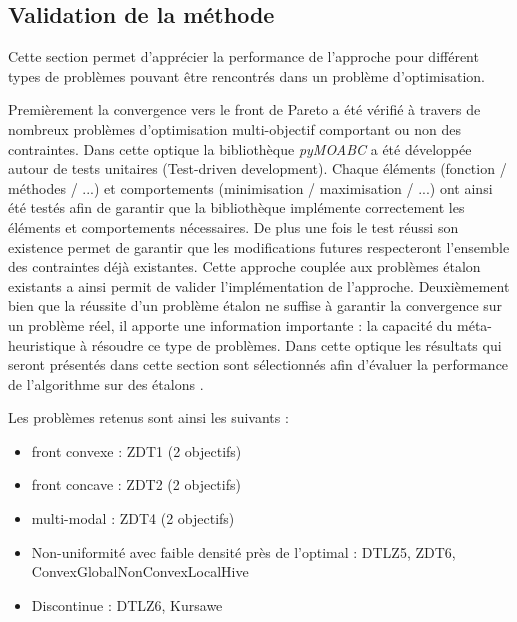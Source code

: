 \subsection{Validation de la méthode} %
\label{sub:validation_de_la_methode}
Cette section permet d’apprécier la performance de l’approche pour différent types
de problèmes pouvant être rencontrés dans un problème d’optimisation.


Premièrement la convergence vers le front de Pareto a été vérifié à travers de nombreux
problèmes d’optimisation multi-objectif comportant ou non des contraintes.
Dans cette optique la bibliothèque \emph{pyMOABC} a été développée autour de tests unitaires
(Test-driven development).
Chaque éléments (fonction / méthodes / ...) et comportements (minimisation / maximisation / ...)
ont ainsi été testés afin de garantir que la bibliothèque implémente correctement
les éléments et comportements nécessaires. De plus une fois le test réussi son existence
permet de garantir que les modifications futures respecteront l’ensemble des contraintes
déjà existantes.
Cette approche couplée aux problèmes étalon existants a ainsi permit de valider
l’implémentation de l’approche.
Deuxièmement bien que la réussite d’un problème étalon ne suffise à garantir la
convergence sur un problème réel, il apporte une information importante : la capacité
du méta-heuristique à résoudre ce type de problèmes. Dans cette optique les résultats
qui seront présentés dans cette section sont sélectionnés afin d’évaluer la performance
de l’algorithme sur des étalons .

Les problèmes retenus sont ainsi les suivants :
\begin{itemize}
  \item front convexe : ZDT1 (2 objectifs)
  \item front concave : ZDT2 (2 objectifs)
  \item multi-modal : ZDT4 (2 objectifs)
  \item Non-uniformité avec faible densité près de l’optimal : DTLZ5, ZDT6, ConvexGlobalNonConvexLocalHive
  \item Discontinue : DTLZ6, Kursawe
\end{itemize}






